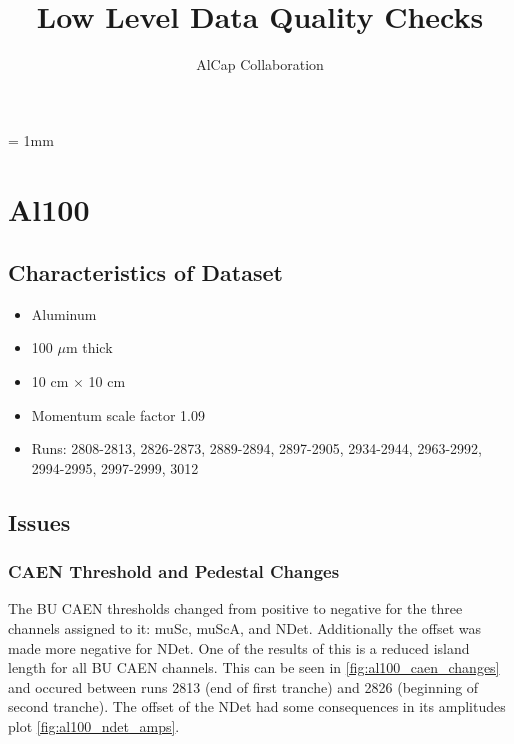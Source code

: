 \documentclass[a4paper]{article}
\title{Low Level Data Quality Checks}
\author{AlCap Collaboration}
\date{}
\begin{document}
\unitlength = 1mm
\maketitle


\section{Al100}
\subsection{Characteristics of Dataset}
\begin{itemize}
  \item Aluminum
  \item 100 $\mu$m thick
  \item 10 cm $\times$ 10 cm
  \item Momentum scale factor 1.09
  \item Runs:
    2808-2813, 2826-2873, 2889-2894,
    2897-2905, 2934-2944, 2963-2992,
    2994-2995, 2997-2999, 3012
\end{itemize}

\subsection{Issues}
\subsubsection{CAEN Threshold and Pedestal Changes}
\label{sec:al100_caen_changes}
The BU CAEN thresholds changed from positive to negative for the three channels assigned to it:
muSc, muScA, and NDet. Additionally the offset was made more negative for NDet. One of the results of this
is a reduced island length for all BU CAEN channels. This can be seen in \ref{fig:al100_caen_changes} and
occured between runs 2813 (end of first tranche) and 2826 (beginning of second tranche). The offset of the NDet
had some consequences in its amplitudes plot \ref{fig:al100_ndet_amps}.
\end{document}
